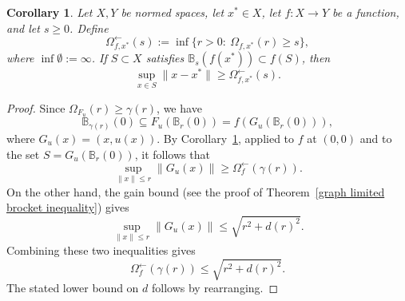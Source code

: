 \documentclass[10pt,a4paper]{amsart}
\newtheorem{corollary}{Corollary}
\begin{document}
    \begin{corollary}\label{reverse norm cor}
        Let \(X,Y\) be normed spaces, let \(x^*\in X\), let \(f:X\to Y\) be a function, and let \(s\geq 0\). Define
        \[
            \Omega_{f,x^*}^{\leftarrow}(s)
            :=
            \inf\{r>0:\ \Omega_{f,x^*}(r)\geq s\},
        \]
        where \(\inf\emptyset:=\infty\). If \(S\subset X\) satisfies $\mathbb B_s(f(x^*))\subset f(S)$, then
        \[
            \sup_{x\in S}\|x-x^*\|
            \geq
            \Omega_{f,x^*}^{\leftarrow}(s).
        \]
    \end{corollary}

    \begin{proof}
        Since $\Omega_{F_u}(r)\geq \gamma(r)$, we have
        $$
            \mathbb{B}_{\gamma(r)}(0)\subseteq F_u(\mathbb{B}_r(0))=f(G_u(\mathbb{B}_r(0))),
        $$
        where $G_u(x)=(x,u(x))$.  By Corollary~\ref{reverse norm cor}, applied to $f$ at $(0,0)$ and to the set $S=G_u(\mathbb{B}_r(0))$, it follows that
        $$
            \sup_{\|x\|\leq r}\|G_u(x)\|\geq \Omega_f^{\leftarrow}(\gamma(r)).
        $$
        On the other hand, the gain bound (see the proof of Theorem~\ref{graph limited brocket inequality}) gives
        $$
            \sup_{\|x\|\leq r}\|G_u(x)\|\leq \sqrt{r^2+d(r)^2}.
        $$
        Combining these two inequalities gives
        $$
            \Omega_f^{\leftarrow}(\gamma(r))\leq \sqrt{r^2+d(r)^2}.
        $$
        The stated lower bound on $d$ follows by rearranging.
    \end{proof}
\end{document}
